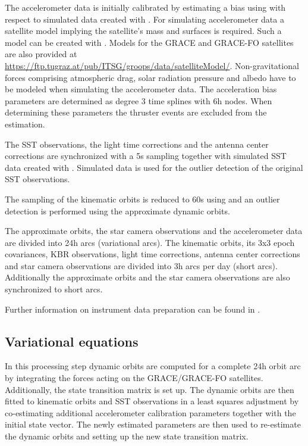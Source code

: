 The accelerometer data is initially calibrated by estimating a bias using
 with respect to simulated data created
with . For simulating accelerometer data a satellite model
implying the satellite's mass and surfaces is required. Such a model can be created with
. Models for the GRACE and GRACE-FO satellites are also provided
at \url{https://ftp.tugraz.at/pub/ITSG/groops/data/satelliteModel/}. Non-gravitational forces
comprising atmospheric drag, solar radiation pressure and albedo have to be modeled when simulating
the accelerometer data. The acceleration bias parameters are determined as degree 3 time splines
with 6h nodes. When determining these parameters the thruster events are excluded from the estimation.

The SST observations, the light time corrections and the antenna center corrections are synchronized
with a 5s sampling together with simulated SST data created with .
Simulated data is used for the outlier detection of the original SST observations.

The sampling of the kinematic orbits is reduced to 60s using  and
an outlier detection is performed using the approximate dynamic orbits.

The approximate orbits, the star camera observations and the accelerometer data are divided into 24h arcs
(variational arcs). The kinematic orbits, its 3x3 epoch covariances, KBR observations,
light time corrections, antenna center corrections and star camera observations are divided into 3h arcs
per day (short arcs). Additionally the approximate orbits and the star camera observations are also
synchronized to short arcs.

Further information on instrument data preparation can be found in
.

\subsection{Variational equations}\label{cookbook.gravityFieldGrace:variational}
In this processing step dynamic orbits are computed for a complete 24h orbit arc by integrating
the forces acting on the GRACE/GRACE-FO satellites. Additionally, the state transition matrix is set up.
The dynamic orbits are then fitted to kinematic orbits and SST observations in a least squares adjustment
by co-estimating additional accelerometer calibration parameters together with the initial state vector.
The newly estimated parameters are then used to re-estimate the dynamic orbits and setting up the new
state transition matrix.

